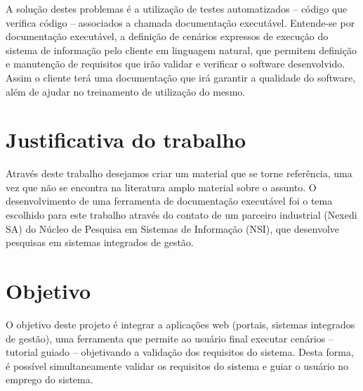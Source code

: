 A solução destes problemas é a utilização de testes automatizados – código que verifica código – associados a chamada documentação executável. Entende-se por documentação executável, a definição de cenários expressos de execução do sistema de informação pelo cliente em linguagem natural, que permitem definição e manutenção de requisitos que irão validar e verificar o software desenvolvido. Assim o cliente terá uma documentação que irá garantir a qualidade do software, além de ajudar no treinamento de utilização do mesmo.

\section{Justificativa do trabalho}

Através deste trabalho desejamos criar um material que se torne referência, uma vez que não se encontra na literatura amplo material sobre o assunto. O desenvolvimento de uma ferramenta de documentação executável foi o tema escolhido para este trabalho através do contato de um parceiro industrial (Nexedi SA) do Núcleo de Pesquisa em Sistemas de Informação (NSI), que desenvolve pesquisas em sistemas integrados de gestão.

\section{Objetivo}

O objetivo deste projeto é integrar a aplicações web (portais, sistemas integrados de gestão), uma ferramenta que permite ao usuário final executar cenários – tutorial guiado – objetivando a validação dos requisitos do sistema. Desta forma, é possível simultaneamente validar os requisitos do sistema e guiar o usuário no emprego do sistema.
